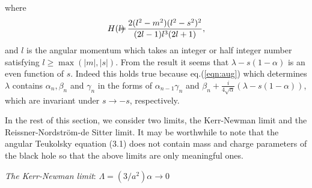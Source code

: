 where 
\begin{eqnarray}
H(l) \makebox[-3mm]{}&=&\makebox[-3mm]{} 
\frac{2(l^2-m^2)(l^2-s^2)^2}{(2l-1)l^3(2l+1)},
\end{eqnarray}
%
and $l$ is the angular momentum which takes an integer or half integer 
number satisfying $l \geq \max(|m|,|s|)$. 
From the result it seems that $\lambda-s(1-\alpha)$ is 
an even function of $s$.
Indeed this holds true because eq.(\ref{eqn:aug}) which determines 
$\lambda$ contains $\alpha_n, \beta_n$ and $\gamma_n$ in the forms of 
$\alpha_{n-1} \gamma_n$ and 
$\beta_n+\frac{i}{4\sqrt{\alpha}}(\lambda-s(1-\alpha))$,  
which are invariant under $s \rightarrow -s$, respectively.

In the rest of this section, we consider two limits, the Kerr-Newman limit  
and the Reissner-Nordstr\"om-de Sitter limit. It may be worthwhile to 
note that the angular Teukolsky equation (3.1) does not contain 
mass and charge parameters of the black hole so that the above limits 
are only meaningful ones. 

\noindent
{\it The Kerr-Newman limit}: $\Lambda=(3/a^2)\alpha 
\rightarrow 0$

